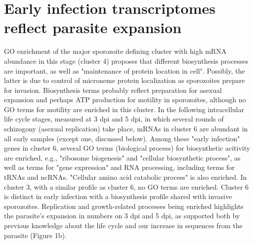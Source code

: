 \documentclass{bmcart}
\begin{document}
\section*{Early infection transcriptomes reflect parasite expansion}
GO enrichment of the major sporozoite defining cluster with high mRNA abundance in this stage (cluster 4) proposes that different biosynthesis processes are important, as well as "maintenance of protein location in cell". Possibly, the latter is due to control of microneme protein localization as sporozoites prepare for invasion. Biosynthesis terms probably reflect preparation for asexual expansion and perhaps ATP production for motility in sporozoites, although no GO terms for motility are enriched in this cluster. In the following intracellular life cycle stages, measured at 3 dpi and 5 dpi, in which several rounds of schizogony (asexual replication) take place, mRNAs in cluster 6 are abundant in all early samples (except one, discussed below). Among these "early infection" genes in cluster 6, several GO terms (biological process) for biosynthetic acitivity are enriched, e.g., "ribosome biogenesis" and "cellular biosynthetic process", as well as terms for "gene expression" and RNA processing, including terms for tRNAs and ncRNAs. "Cellular amino acid catabolic process" is also enriched. In cluster 3, with a similar profile as cluster 6, no GO terms are enriched. Cluster 6 is distinct in early infection with a biosynthesis profile shared with invasive sporozoites. Replication and growth-related processes being enriched highlights the parasite's expansion in numbers on 3 dpi and 5 dpi, as supported both by previous knowledge about the life cycle and our increase in sequences from the parasite (Figure 1b). 
\end{document}
